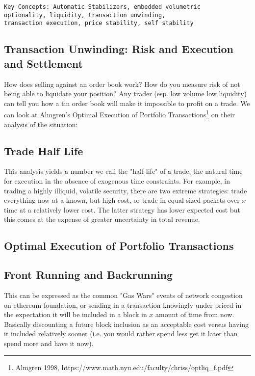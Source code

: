 \begin{verbatim}
Key Concepts: Automatic Stabilizers, embedded volumetric
optionality, liquidity, transaction unwinding, 
transaction execution, price stability, self stability
 \end{verbatim}
    \vspace{2mm}

\subsection{Transaction Unwinding: Risk and Execution and Settlement}

How does selling against an order book work? How do you measure risk of not being able to liquidate your position? Any trader (esp. low volume
low liquidity) can tell you how a tin order book will make it 
impossible to profit on a trade. We can look at Almgren's Optimal 
Execution of Portfolio Transactions\footnote{Almgren 1998, https://www.math.nyu.edu/faculty/chriss/optliq_f.pdf} on their analysis of the situation:
    \vspace{2mm}
\subsection{Trade Half Life}
This analysis yields a number we call the "half-life" of a trade, the 
natural time for execution in the absence of exogenous time 
constraints. For example, in trading a highly illiquid, volatile 
security, there are two extreme strategies: trade everything now at a 
known, but high cost, or trade in equal sized packets over $x$ time 
at a relatively lower cost. The latter strategy has lower expected cost but this comes at the expense of greater uncertainty in total revenue.
    \vspace{2mm}
\subsection{Optimal Execution of Portfolio Transactions}
    \vspace{2mm}
\subsection{Front Running and Backrunning}
This can be expressed as the common "Gas Wars" events of network 
congestion on ethereum foundation, or sending in a transaction knowingly under priced in the expectation it will be included in a block in $x$ amount of time from now. Basically discounting a future 
block inclusion as an acceptable cost versus having it included relatively sooner (i.e. you would rather spend less get it later than 
spend more and have it now).

